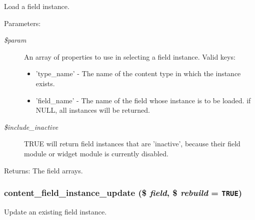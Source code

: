 Load a field instance.

\begin{Desc}
\item[Parameters:]
\begin{description}
\item[{\em \$param}]An array of properties to use in selecting a field instance. Valid keys:\begin{itemize}
\item 'type\_\-name' - The name of the content type in which the instance exists.\item 'field\_\-name' - The name of the field whose instance is to be loaded. if NULL, all instances will be returned. \end{itemize}
\item[{\em \$include\_\-inactive}]TRUE will return field instances that are 'inactive', because their field module or widget module is currently disabled. \end{description}
\end{Desc}
\begin{Desc}
\item[Returns:]The field arrays. \end{Desc}
\hypertarget{content_8crud_8inc_87fab5002b89ec0689ac287ba654f524}{
\subsubsection[{content\_\-field\_\-instance\_\-update}]{\setlength{\rightskip}{0pt plus 5cm}content\_\-field\_\-instance\_\-update (\$ {\em field}, \/  \$ {\em rebuild} = {\tt TRUE})}}
\label{content_8crud_8inc_87fab5002b89ec0689ac287ba654f524}


Update an existing field instance.

